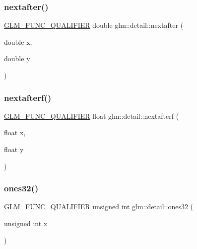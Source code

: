 \mbox{\label{namespaceglm_1_1detail_a3c14f8400407e8b4cff5be12ceef2c1e}} 
\subsubsection{\texorpdfstring{nextafter()}{nextafter()}}
{\footnotesize\ttfamily \hyperlink{setup_8hpp_a33fdea6f91c5f834105f7415e2a64407}{G\+L\+M\+\_\+\+F\+U\+N\+C\+\_\+\+Q\+U\+A\+L\+I\+F\+I\+ER} double glm\+::detail\+::nextafter (\begin{DoxyParamCaption}\item[{double}]{x,  }\item[{double}]{y }\end{DoxyParamCaption})}

\mbox{\label{namespaceglm_1_1detail_ab0eb795c482130b1d6c83470bdb031e6}} 
\subsubsection{\texorpdfstring{nextafterf()}{nextafterf()}}
{\footnotesize\ttfamily \hyperlink{setup_8hpp_a33fdea6f91c5f834105f7415e2a64407}{G\+L\+M\+\_\+\+F\+U\+N\+C\+\_\+\+Q\+U\+A\+L\+I\+F\+I\+ER} float glm\+::detail\+::nextafterf (\begin{DoxyParamCaption}\item[{float}]{x,  }\item[{float}]{y }\end{DoxyParamCaption})}

\mbox{\label{namespaceglm_1_1detail_a2699e3b3ea6ad8d4bb99aed56761582c}} 
\subsubsection{\texorpdfstring{ones32()}{ones32()}}
{\footnotesize\ttfamily \hyperlink{setup_8hpp_a33fdea6f91c5f834105f7415e2a64407}{G\+L\+M\+\_\+\+F\+U\+N\+C\+\_\+\+Q\+U\+A\+L\+I\+F\+I\+ER} unsigned int glm\+::detail\+::ones32 (\begin{DoxyParamCaption}\item[{unsigned int}]{x }\end{DoxyParamCaption})}


